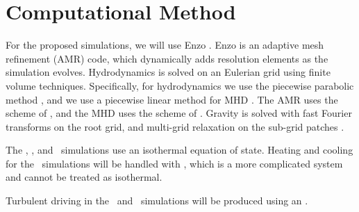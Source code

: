 \section{Computational Method}
\label{sec.method}

For the proposed simulations, we will use Enzo \citep{Collins10, Bryan14}.  Enzo
is an adaptive mesh refinement (AMR) code, which dynamically adds resolution
elements as the simulation evolves.  Hydrodynamics is solved on an Eulerian grid
using finite volume techniques.  Specifically, for hydrodynamics we use the
piecewise parabolic method \citep{Colella84}, and we use a piecewise linear
method for MHD \citep{Li08}.  The AMR uses the scheme of \citet{Berger84}, and
the MHD uses the scheme of \citet{Balsara01}.  Gravity is solved with fast
Fourier transforms on the root grid, and multi-grid relaxation on the sub-grid
patches \citep{Bryan14}.  

The \nameTurbulence, \nameCores, and  \nameCMB\ simulations use an isothermal
equation of state.  Heating and cooling for the \nameGalaxies\ simulations will
be handled with , which is a more complicated system and cannot be
treated as isothermal.

Turbulent driving in the \nameTurbulence\ and \nameCMB\ simulations will be
produced
using an .




